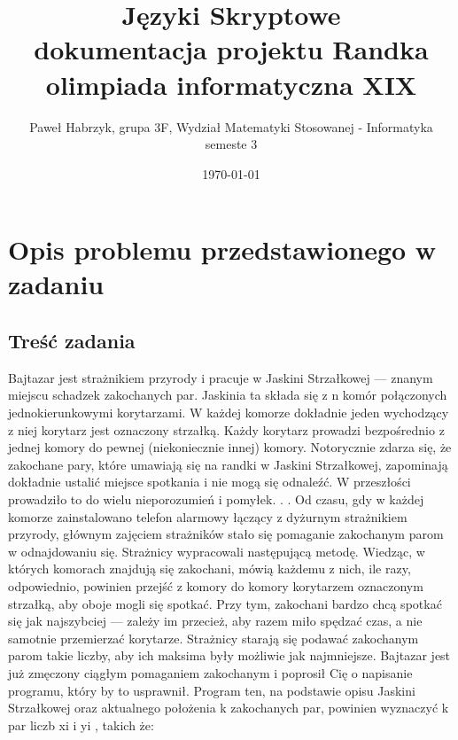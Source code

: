 \documentclass[12pt,a4paper]{article}
\begin{document}
	
	\title{Języki Skryptowe\\\small{dokumentacja projektu Randka olimpiada informatyczna XIX}}
	\author{Paweł Habrzyk, grupa 3F, Wydział Matematyki Stosowanej - Informatyka semeste 3}
	\date{\today}

	\maketitle
	\newpage
	
	\tableofcontents
	
	\newpage
	\section{Opis problemu przedstawionego w zadaniu}
	
    	\subsection{Treść zadania}
        	Bajtazar jest strażnikiem przyrody i pracuje w Jaskini Strzałkowej — znanym miejscu schadzek
zakochanych par. Jaskinia ta składa się z n komór połączonych jednokierunkowymi korytarzami. W każdej komorze dokładnie jeden wychodzący z niej korytarz jest oznaczony strzałką.
Każdy korytarz prowadzi bezpośrednio z jednej komory do pewnej (niekoniecznie innej) komory.
Notorycznie zdarza się, że zakochane pary, które umawiają się na randki w Jaskini Strzałkowej, zapominają dokładnie ustalić miejsce spotkania i nie mogą się odnaleźć. W przeszłości
prowadziło to do wielu nieporozumień i pomyłek. . . Od czasu, gdy w każdej komorze zainstalowano telefon alarmowy łączący z dyżurnym strażnikiem przyrody, głównym zajęciem strażników stało się pomaganie zakochanym parom w odnajdowaniu się.
Strażnicy wypracowali następującą metodę. Wiedząc, w których komorach znajdują się
zakochani, mówią każdemu z nich, ile razy, odpowiednio, powinien przejść z komory do komory
korytarzem oznaczonym strzałką, aby oboje mogli się spotkać. Przy tym, zakochani bardzo
chcą spotkać się jak najszybciej — zależy im przecież, aby razem miło spędzać czas, a nie
samotnie przemierzać korytarze. Strażnicy starają się podawać zakochanym parom takie liczby,
aby ich maksima były możliwie jak najmniejsze.
Bajtazar jest już zmęczony ciągłym pomaganiem zakochanym i poprosił Cię o napisanie
programu, który by to usprawnił. Program ten, na podstawie opisu Jaskini Strzałkowej oraz aktualnego położenia k zakochanych par, powinien wyznaczyć k par liczb xi
i yi
, takich że:
\end{document}
